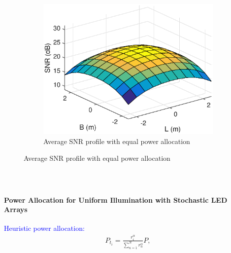 \documentclass{beamer}
\providecommand{\sbrak}[1]{\ensuremath{{}\left[#1\right]}}
\theoremstyle{remark}
\begin{document}
\begin{frame}
\begin{figure}[t!]
\begin{subfigure}[t]{0.5\columnwidth}
        \includegraphics[width=\columnwidth]{randomNoPowerDist_new}
        \caption{Average SNR profile with equal power allocation}
\label{fig3:subfig2}
    \end{subfigure}
  \end{figure}
\end{frame}


\begin{frame}
\frametitle{\,}
\framesubtitle{Power Allocation for Uniform Illumination with
Stochastic LED Arrays}
\begin{list}{}{}
\item \textcolor{blue}{Heuristic power allocation:}
\begin{align}
\label{power_alloc}
P_{t_i}=\frac{r_i^{\alpha}}{\sum_{n=1}^Nr_n^{\alpha}}P,\nonumber
\end{align}
\end{list}
 \end{frame}
\end{document}
